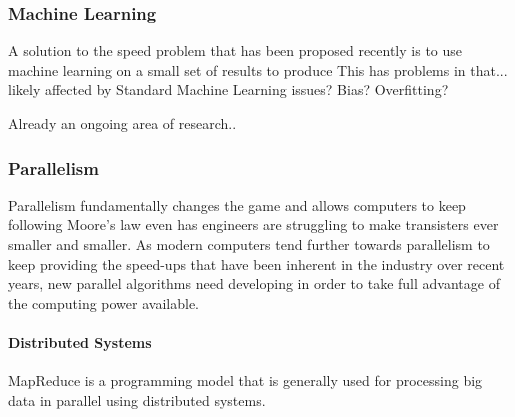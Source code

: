 \documentclass{UoYCSproject}
\begin{document}
\subsubsection{Machine Learning}
A solution to the speed problem that has been proposed recently is to use machine learning on a small set of results to produce\cite{kieran_machine_learning}
This has problems in that...
likely affected by Standard Machine Learning issues? Bias? Overfitting?

Already an ongoing area of research.. 

\subsubsection{Parallelism}
Parallelism fundamentally changes the game and allows computers to keep following Moore's law even has engineers are struggling to make transisters ever smaller and smaller\cite{concurrency_revolution}.
As modern computers tend further towards parallelism to keep providing the speed-ups that have been inherent in the industry over recent years, new parallel algorithms need developing in order to take full advantage of the computing power available.


\paragraph{Distributed Systems}
MapReduce is a programming model that is generally used for processing big data in parallel using distributed systems.
\end{document}
